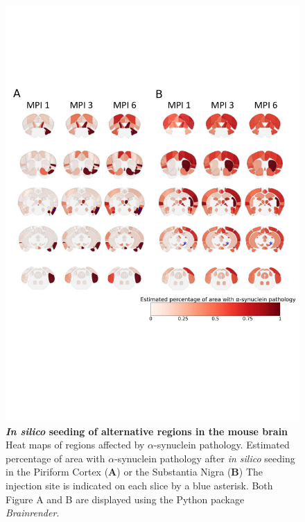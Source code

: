 \begin{figure}
    
    \includegraphics[width=\linewidth]{Figures/Fig4.pdf}

    \caption{\textbf{\textit{In silico} seeding of alternative regions in the mouse brain} \\
    Heat maps of regions affected by $\alpha$-synuclein pathology.
    Estimated percentage of area with $\alpha$-synuclein pathology after \textit{in silico} seeding in the Piriform Cortex (\textbf{A}) or the Substantia Nigra (\textbf{B}) The injection site is indicated on each slice by a blue asterisk. Both Figure A and B are displayed using the Python package \textit{Brainrender}. \cite{Claudi_2021}}
    \label{fig:fig4}
    \end{figure}
    

